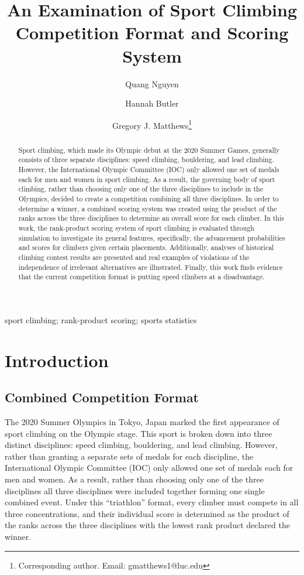 \documentclass[letterpaper, inpress]{jds} %
\title[An Examination of Sport Climbing Competition Format and Scoring System]{An Examination of Sport Climbing Competition Format and Scoring System}
\author[1]{Quang Nguyen}
\author[2]{Hannah Butler}
\author[1]{Gregory J. Matthews\footnote{Corresponding author. Email: gmatthews1@luc.edu}}
\affil[1]{Department of Mathematics and Statistics, Loyola University Chicago, Chicago, IL, USA}
\affil[2]{Department of Statistics, Colorado State University, Fort Collins, CO, USA}
\begin{document}
\maketitle
\begin{abstract}
Sport climbing, which made its Olympic debut at the 2020 Summer Games, generally consists of three separate disciplines: speed climbing, bouldering, and lead climbing. However, the International Olympic Committee (IOC) only allowed one set of medals each for men and women in sport climbing. As a result, the governing body of sport climbing, rather than choosing only one of the three disciplines to include in the Olympics, decided to create a competition combining all three disciplines. In order to determine a winner, a combined scoring system was created using the product of the ranks across the three disciplines to determine an overall score for each climber. In this work, the rank-product scoring system of sport climbing is evaluated through simulation to investigate its general features, specifically, the advancement probabilities and scores for climbers given certain placements. Additionally, analyses of historical climbing contest results are presented and real examples of violations of the independence of irrelevant alternatives are illustrated. Finally, this work finds evidence that the current competition format is putting speed climbers at a disadvantage.\@
\end{abstract}

\begin{keywords} %
sport climbing; rank-product scoring; sports statistics
\end{keywords}

\section{Introduction}
\label{sec:sec1}

\subsection{Combined Competition Format}
\label{sec1pt1}

The 2020 Summer Olympics in Tokyo, Japan marked the first appearance of
sport climbing on the Olympic stage. This sport is broken down into
three distinct disciplines: speed climbing, bouldering, and lead
climbing. However, rather than granting a separate sets of medals for
each discipline, the International Olympic Committee (IOC) only allowed
one set of medals each for men and women. As a result, rather than
choosing only one of the three disciplines all three disciplines were
included together forming one single combined event. Under this
``triathlon'' format, every climber must compete in all three
concentrations, and their individual score is determined as the product
of the ranks across the three disciplines with the lowest rank product
declared the winner.
\end{document}
